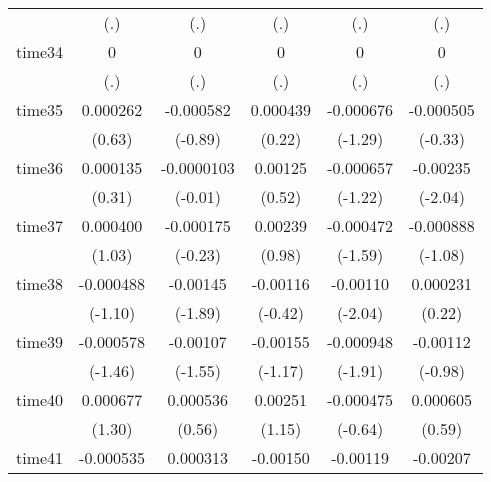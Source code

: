 \begin{table}[htbp]
\begin{tabular}{l*{5}{c}}
            &         (.)         &         (.)         &         (.)         &         (.)         &         (.)         \\
time34      &           0         &           0         &           0         &           0         &           0         \\
            &         (.)         &         (.)         &         (.)         &         (.)         &         (.)         \\
time35      &    0.000262         &   -0.000582         &    0.000439         &   -0.000676         &   -0.000505         \\
            &      (0.63)         &     (-0.89)         &      (0.22)         &     (-1.29)         &     (-0.33)         \\
time36      &    0.000135         &  -0.0000103         &     0.00125         &   -0.000657         &    -0.00235\sym{*}  \\
            &      (0.31)         &     (-0.01)         &      (0.52)         &     (-1.22)         &     (-2.04)         \\
time37      &    0.000400         &   -0.000175         &     0.00239         &   -0.000472         &   -0.000888         \\
            &      (1.03)         &     (-0.23)         &      (0.98)         &     (-1.59)         &     (-1.08)         \\
time38      &   -0.000488         &    -0.00145         &    -0.00116         &    -0.00110\sym{*}  &    0.000231         \\
            &     (-1.10)         &     (-1.89)         &     (-0.42)         &     (-2.04)         &      (0.22)         \\
time39      &   -0.000578         &    -0.00107         &    -0.00155         &   -0.000948         &    -0.00112         \\
            &     (-1.46)         &     (-1.55)         &     (-1.17)         &     (-1.91)         &     (-0.98)         \\
time40      &    0.000677         &    0.000536         &     0.00251         &   -0.000475         &    0.000605         \\
            &      (1.30)         &      (0.56)         &      (1.15)         &     (-0.64)         &      (0.59)         \\
time41      &   -0.000535         &    0.000313         &    -0.00150         &    -0.00119\sym{*}  &    -0.00207         \\

\end{tabular}
\end{table}

